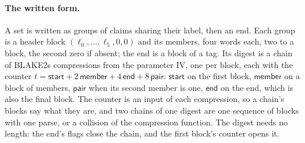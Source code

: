 \paragraph{The written form.} A set is written as groups of claims sharing their label, then an end. Each group is a header block $(\ell_0,\dots,\ell_5,0,0)$ and its members, four words each, two to a block, the second zero if absent; the end is a block of a tag. Its digest is a chain of BLAKE2s compressions from the parameter IV, one per block, each with the counter $t=\mathsf{start}+2\,\mathsf{member}+4\,\mathsf{end}+8\,\mathsf{pair}$: $\mathsf{start}$ on the first block, $\mathsf{member}$ on a block of members, $\mathsf{pair}$ when its second member is one, $\mathsf{end}$ on the end, which is also the final block. The counter is an input of each compression, so a chain's blocks say what they are, and two chains of one digest are one sequence of blocks with one parse, or a collision of the compression function. The digest needs no length: the end's flags close the chain, and the first block's counter opens it.

